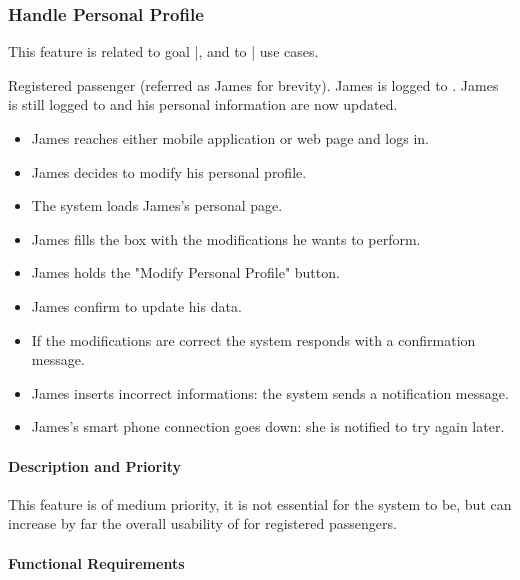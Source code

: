 \subsubsection{Handle Personal Profile}
This feature is related to goal |, and to | use cases.
\begin{itemize}
	 Registered passenger (referred as James for brevity).
	 James is logged to \myTaxiService{}.
	 James is still logged to \myTaxiService{} and his personal information are now updated.
	\begin{itemize}
		\item James reaches either \myTaxiService{} mobile application or web page and logs in.
		\item James decides to modify his personal profile.
		\item The system loads James's personal page.
		\item James fills the box with the modifications he wants to perform.
		\item James holds the "Modify Personal Profile" button.
		\item James confirm to update his data.
		\item If the modifications are correct the system responds with a confirmation message.
	\end{itemize}
	\begin{itemize}
		\item James inserts incorrect informations: the system sends a notification message.
		\item James's smart phone connection goes down: she is notified to try again later.
	\end{itemize}
\end{itemize}
\paragraph{Description and Priority}
This feature is of medium priority, it is not essential for the system to be, but can increase by far the overall usability of \myTaxiService{} for registered passengers.\par
\paragraph{Functional Requirements}
\begin{itemize}
\end{itemize}
